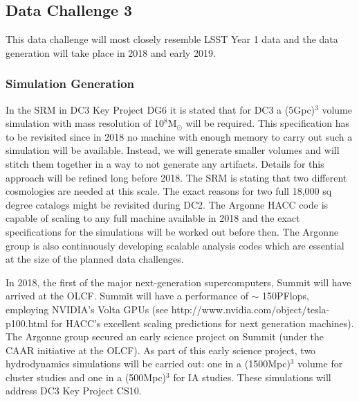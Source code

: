 
\subsection{Data Challenge 3}
\label{sec:keysims:dc3}

This data challenge will most closely resemble LSST Year 1 data and the data generation will take place in 2018 and early 2019.


\subsubsection{Simulation Generation}
\label{sec:keysims:dc3:simgen}

In the SRM in DC3 Key Project DG6 it is stated that for DC3 a (5Gpc)$^3$ volume simulation with mass resolution of 10$^8$M$_\odot$ will be required. This specification has to be revisited since in 2018 no machine with enough memory to carry out such a simulation will be available. Instead, we will generate smaller volumes and will stitch them together in a way to not generate any artifacts. Details for this approach will be refined long before 2018. The SRM is stating that two different cosmologies are needed at this scale. The exact reasons for two full 18,000 sq degree catalogs might be revisited during DC2. The Argonne HACC code is capable of scaling to any full machine available in 2018 and the exact specifications for the simulations will be worked out before then. The Argonne group is also continuously developing scalable analysis codes which are essential at the size of the planned data challenges.

In 2018, the first of the major next-generation supercomputers, Summit will have arrived at the OLCF. Summit will have a performance of $\sim$ 150PFlops, employing NVIDIA's Volta GPUs (see http://www.nvidia.com/object/tesla-p100.html for HACC's excellent scaling predictions for next generation machines). The Argonne group secured an early science project on Summit (under the CAAR initiative at the OLCF). As part of this early science project, two hydrodynamics simulations will be carried out: one in a (1500Mpc)$^3$ volume for cluster studies and one in a (500Mpc)$^3$ for IA studies. These simulations will address DC3 Key Project CS10.

